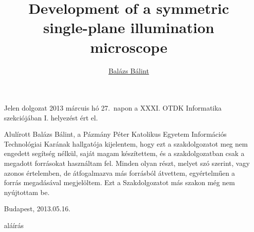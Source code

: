\documentclass{diploma_style}
\author{\href{mailto:balint.balazs@molbiol.eu}{Balázs Bálint}}
\title{Development of a symmetric single-plane illumination microscope}
\begin{document}
\maketitle
{}

\begin{OTDK}

Jelen dolgozat 2013 márcuis hó 27.\ napon a XXXI. OTDK Informatika szekciójában I. helyezést ért el.
\end{OTDK}

\begin{nyilatkozat}
Alulírott Balázs Bálint, a Pázmány Péter Katolikus Egyetem Információs Technológiai Karának hallgatója kijelentem, hogy ezt a szakdolgozatot meg nem engedett segítség nélkül, saját magam készítettem, és a szakdolgozatban csak a megadott forrásokat használtam fel. Minden olyan részt, melyet szó szerint, vagy azonos értelemben, de átfogalmazva más forrásból átvettem, egyértelműen a forrás megadásával megjelöltem. Ezt a Szakdolgozatot más szakon még nem nyújtottam be.


\vspace{1em}
Budapest, 2013.05.16.

\vspace{20mm}
\hspace{90mm}
aláírás
\end{nyilatkozat}
\end{document}
